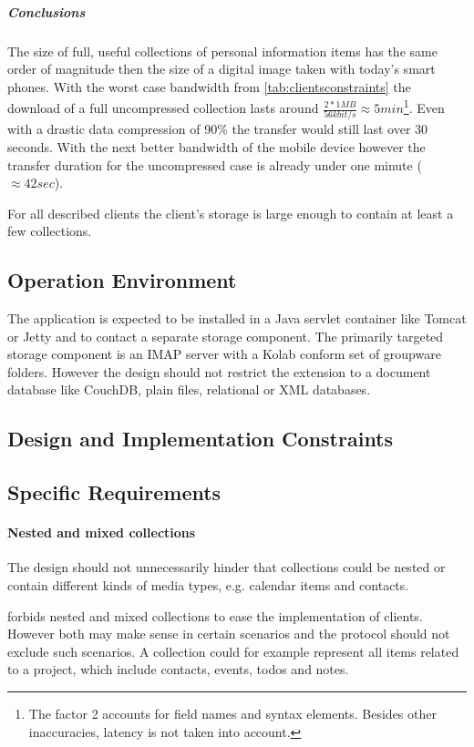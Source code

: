 \documentclass[12pt,a4paper]{scrartcl}		%
\begin{document}
\subparagraph{Conclusions} The size of full, useful collections of personal
information items has the same order of magnitude then the size of a digital
image taken with today's smart phones. With the worst case bandwidth from
\autoref{tab:clientsconstraints} the download of a full uncompressed collection
lasts around $\frac{2 * 1MB}{56kbit/s} \approx 5min$\footnote{The factor 2
  accounts for field names and syntax elements. Besides other inaccuracies,
  latency is not taken into account.}. Even with a drastic data compression of
90\% the transfer would still last over 30 seconds. With the next better
bandwidth of the mobile device however the transfer duration for the
uncompressed case is already under one minute ($\approx 42 sec$).

For all described clients the client's storage is large enough to contain at
least a few collections.

\subsection{Operation Environment}

The application is expected to be installed in a Java servlet container like
Tomcat or Jetty and to contact a separate storage component. The primarily
targeted storage component is an IMAP server with a Kolab conform set of
groupware folders. However the design should not restrict the extension to a
document database like CouchDB, plain files, relational or XML databases.

\subsection{Design and Implementation Constraints}

\subsection{Specific Requirements}

\paragraph{Nested and mixed collections}
The design should not unnecessarily hinder that collections could be nested or
contain different kinds of media types, e.g. calendar items and contacts. 

\cite[sec. 5.2]{RFC6352} forbids nested and mixed collections to ease the
implementation of clients. However both may make sense in certain scenarios and
the protocol should not exclude such scenarios. A collection could for example
represent all items related to a project, which include contacts, events, todos
and notes.
\end{document}
